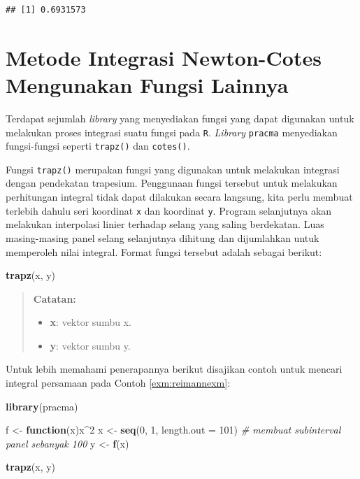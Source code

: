 \documentclass[]{book}
\newenvironment{Shaded}{\begin{snugshade}}{\end{snugshade}}
\newcommand{\CommentTok}[1]{\textcolor[rgb]{0.56,0.35,0.01}{\textit{#1}}}
\newcommand{\ControlFlowTok}[1]{\textcolor[rgb]{0.13,0.29,0.53}{\textbf{#1}}}
\newcommand{\DataTypeTok}[1]{\textcolor[rgb]{0.13,0.29,0.53}{#1}}
\newcommand{\DecValTok}[1]{\textcolor[rgb]{0.00,0.00,0.81}{#1}}
\newcommand{\KeywordTok}[1]{\textcolor[rgb]{0.13,0.29,0.53}{\textbf{#1}}}
\newcommand{\NormalTok}[1]{#1}
\newcommand{\OperatorTok}[1]{\textcolor[rgb]{0.81,0.36,0.00}{\textbf{#1}}}
\newcommand{\StringTok}[1]{\textcolor[rgb]{0.31,0.60,0.02}{#1}}
\providecommand{\tightlist}{%
  \setlength{\itemsep}{0pt}\setlength{\parskip}{0pt}}
\theoremstyle{definition}
\theoremstyle{definition}
\theoremstyle{definition}
\theoremstyle{remark}
\begin{document}
\begin{verbatim}
## [1] 0.6931573
\end{verbatim}

\hypertarget{metode-integrasi-newton-cotes-mengunakan-fungsi-lainnya}{%
\section{Metode Integrasi Newton-Cotes Mengunakan Fungsi Lainnya}\label{metode-integrasi-newton-cotes-mengunakan-fungsi-lainnya}}

Terdapat sejumlah \emph{library} yang menyediakan fungsi yang dapat digunakan untuk melakukan proses integrasi suatu fungsi pada \texttt{R}. \emph{Library} \texttt{pracma} menyediakan fungsi-fungsi seperti \texttt{trapz()} dan \texttt{cotes()}.

Fungsi \texttt{trapz()} merupakan fungsi yang digunakan untuk melakukan integrasi dengan pendekatan trapesium. Penggunaan fungsi tersebut untuk melakukan perhitungan integral tidak dapat dilakukan secara langsung, kita perlu membuat terlebih dahulu seri koordinat \texttt{x} dan koordinat \texttt{y}. Program selanjutnya akan melakukan interpolasi linier terhadap selang yang saling berdekatan. Luas masing-masing panel selang selanjutnya dihitung dan dijumlahkan untuk memperoleh nilai integral. Format fungsi tersebut adalah sebagai berikut:

\begin{Shaded}
\begin{Highlighting}[]
\KeywordTok{trapz}\NormalTok{(x, y)}
\end{Highlighting}
\end{Shaded}

\begin{quote}
\textbf{Catatan:}

\begin{itemize}
\tightlist
\item
  \textbf{x}: vektor sumbu x.
\item
  \textbf{y}: vektor sumbu y.
\end{itemize}
\end{quote}

Untuk lebih memahami penerapannya berikut disajikan contoh untuk mencari integral persamaan pada Contoh \ref{exm:reimannexm}:

\begin{Shaded}
\begin{Highlighting}[]
\KeywordTok{library}\NormalTok{(pracma)}

\NormalTok{f <-}\StringTok{ }\ControlFlowTok{function}\NormalTok{(x)x}\OperatorTok{^}\DecValTok{2}
\NormalTok{x <-}\StringTok{ }\KeywordTok{seq}\NormalTok{(}\DecValTok{0}\NormalTok{, }\DecValTok{1}\NormalTok{, }\DataTypeTok{length.out =} \DecValTok{101}\NormalTok{) }\CommentTok{# membuat subinterval panel sebanyak 100}
\NormalTok{y <-}\StringTok{ }\KeywordTok{f}\NormalTok{(x)}

\KeywordTok{trapz}\NormalTok{(x, y)}
\end{Highlighting}
\end{Shaded}
\end{document}
